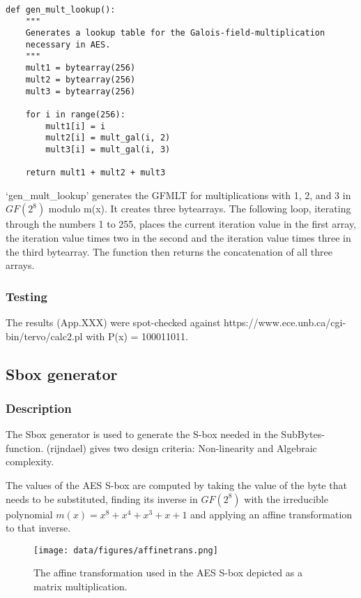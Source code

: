 \begin{lstlisting}
def gen_mult_lookup():
    """
    Generates a lookup table for the Galois-field-multiplication
    necessary in AES.
    """
    mult1 = bytearray(256)
    mult2 = bytearray(256)
    mult3 = bytearray(256)

    for i in range(256):
        mult1[i] = i
        mult2[i] = mult_gal(i, 2)
        mult3[i] = mult_gal(i, 3)

    return mult1 + mult2 + mult3
\end{lstlisting}

`gen\_mult\_lookup' generates the GFMLT for multiplications with 1, 2,
and 3 in $GF(2^{8})$ modulo m(x). It creates three bytearrays. The following
loop, iterating through the numbers 1 to 255, places the current
iteration value in the first array, the iteration value times two in the
second and the iteration value times three in the third bytearray. The
function then returns the concatenation of all three arrays.

\hypertarget{testing}{%
\subsubsection{Testing}\label{testing}}

The results (App.XXX) were spot-checked against
https://www.ece.unb.ca/cgi-bin/tervo/calc2.pl with P(x) = 100011011.

\hypertarget{sbox-generator}{%
\subsection{Sbox generator}\label{sbox-generator}}

\hypertarget{description-1}{%
\subsubsection{Description}\label{description-1}}

The Sbox generator is used to generate the S-box needed in the
SubBytes-function. (rijndael) gives two design criteria: Non-linearity
and Algebraic complexity.

The values of the AES S-box are computed by taking the value of the byte
that needs to be substituted, finding its inverse in $GF(2^{8})$ with the
irreducible polynomial $m(x) = x^8 + x^4 + x^3 + x + 1$ and applying an
affine transformation to that inverse.

\begin{figure}
\centering
\texttt{[image: data/figures/affinetrans.png]} 
\caption{The affine transformation used in the AES S-box depicted as a matrix multiplication.}
\end{figure}

